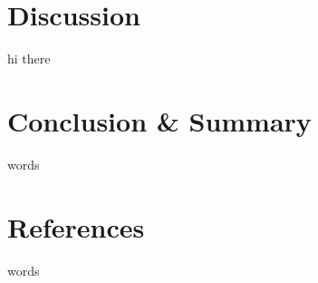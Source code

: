 \documentclass[fleqn,12pt]{SelfArx} %
\begin{document}

\section{Discussion}
hi there

\section{Conclusion \& Summary}
words

\section{References}
words

% 
% 

\end{document}
